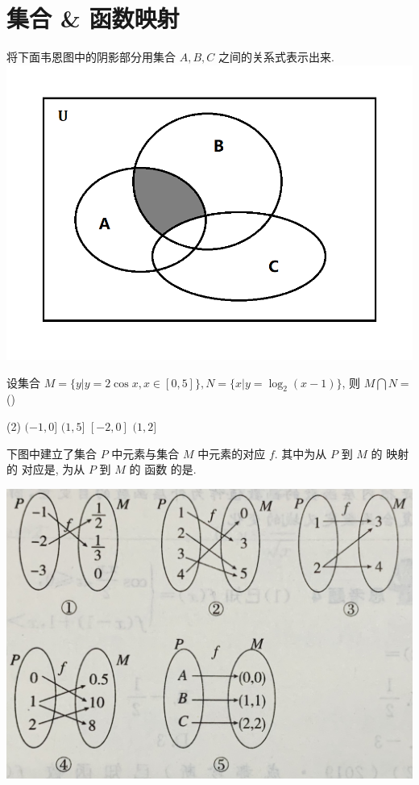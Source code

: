 \documentclass{article}
\begin{document}
    \section{集合 \& 函数映射}

    \begin{Exercise}
        \vspace{-\baselineskip}%

        \Question 将下面韦恩图中的阴影部分用集合 $A, B, C$ 之间的关系式表示出来\underline{\hspace{2cm}}.
        \includegraphics[scale = 0.2]{Sets_internal.png}

        \Question 设集合 $M=\{y|y=2\cos x, x\in[0,5]\}, N=\{x|y=\log_2(x-1)\}$, 则 $M \bigcap N = $(\hspace{1cm}) 
        \begin{tasks}[resume=true](2)
            \task $(-1, 0]$
            \task $(1, 5]$
            \task $[-2, 0]$
            \task $(1, 2]$
        \end{tasks}

        \Question 下图中建立了集合 $P$ 中元素与集合 $M$ 中元素的对应 $f$. 其中为从 $P$ 到 $M$ 的 映射 的
        对应是\underline{\hspace{1.5cm}}, 为从 $P$ 到 $M$ 的 函数 的是\underline{\hspace{1.5cm}}.

        \includegraphics[scale = 0.1]{mapping.png}


\end{Exercise}
\end{document}
